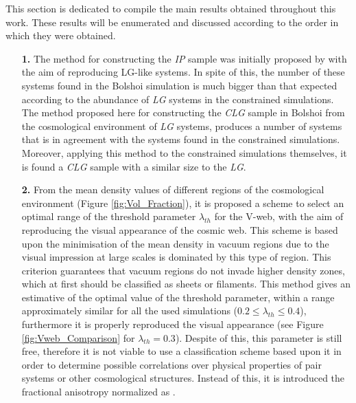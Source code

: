 This section is dedicated to compile the main results obtained throughout 
this work. These results will be enumerated and discussed according to the
order in which they were obtained.


\begin{enumerate}
\item[\textbf{1.}] The method for constructing the \textit{IP} sample was
initially proposed by \cite{forero2011} with the aim of reproducing 
LG-like systems. In spite of this, the number of these systems found in 
the Bolshoi simulation is much bigger than that expected according to the 
abundance of \textit{LG} systems in the constrained simulations. The 
method proposed here for constructing the \textit{CLG} sample in Bolshoi 
from the cosmological environment of \textit{LG} systems, produces a 
number of systems that is in agreement with the systems found in the 
constrained simulations. Moreover, applying this method to the constrained 
simulations themselves, it is found a \textit{CLG} sample with a similar 
size to the \textit{LG}.


\item[\textbf{2.}] From the mean density values of different regions of
the cosmological environment (Figure \ref{fig:Vol_Fraction}), it is 
proposed a scheme to select an optimal range of the threshold parameter
$\lambda_{th}$ for the V-web, with the aim of reproducing the visual 
appearance of the cosmic web. This scheme is based upon the minimisation
of the mean density in vacuum regions due to the visual impression at 
large scales is dominated by this type of region. This criterion 
guarantees that vacuum regions do not invade higher density zones, which
at first should be classified as sheets or filaments. This method gives an
estimative of the optimal value of the threshold parameter, within a range
approximately similar for all the used simulations ($0.2 \leq \lambda_{th} 
\leq 0.4$), furthermore it is properly reproduced the visual appearance
(see Figure \ref{fig:Vweb_Comparison} for $\lambda_{th} = 0.3$). Despite
of this, this parameter is still free, therefore it is not viable to use
a classification scheme based upon it in order to determine possible 
correlations over physical properties of pair systems or other 
cosmological structures. Instead of this, it is introduced the fractional
anisotropy normalized as \cite{libeskind2013}.



\end{enumerate}

